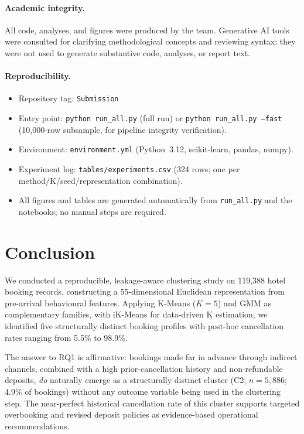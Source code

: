 \documentclass[12pt,a4paper]{article}
\begin{document}
\paragraph{Academic integrity.}
All code, analyses, and figures were produced by the team.
Generative AI tools were consulted for clarifying methodological concepts
and reviewing syntax; they were not used to generate substantive code,
analyses, or report text.

\paragraph{Reproducibility.}
\begin{itemize}[noitemsep]
  \item Repository tag: \texttt{Submission}
  \item Entry point: \texttt{python run\_all.py} (full run) or
        \texttt{python run\_all.py --fast} (10,000-row subsample, for pipeline
        integrity verification).
  \item Environment: \texttt{environment.yml} (Python~3.12, scikit-learn,
        pandas, numpy).
  \item Experiment log: \texttt{tables/experiments.csv} (324 rows; one per
        method/K/seed/representation combination).
  \item All figures and tables are generated automatically from
        \texttt{run\_all.py} and the notebooks; no manual steps are required.
\end{itemize}


\section{Conclusion}
\label{sec:conclusion}

We conducted a reproducible, leakage-aware clustering study on 119,388
hotel booking records, constructing a 55-dimensional Euclidean
representation from pre-arrival behavioural features.
Applying K-Means ($K=5$) and GMM as complementary families, with iK-Means
for data-driven K estimation, we identified five structurally distinct
booking profiles with post-hoc cancellation rates ranging from 5.5\% to
98.9\%.

The answer to RQ1 is affirmative: bookings made far in advance through
indirect channels, combined with a high prior-cancellation history and
non-refundable deposits, \emph{do} naturally emerge as a structurally
distinct cluster (C2; $n=5{,}886$; 4.9\% of bookings) without any
outcome variable being used in the clustering step.
The near-perfect historical cancellation rate of this cluster supports
targeted overbooking and revised deposit policies as evidence-based
operational recommendations.
\end{document}
